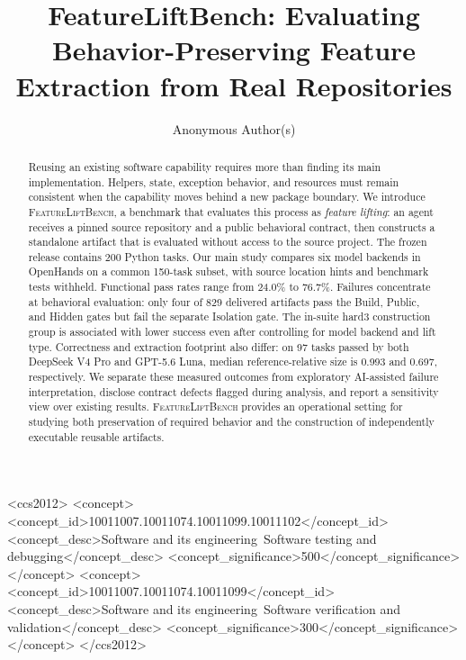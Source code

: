 \documentclass[acmsmall,screen,review,anonymous]{acmart}
\newcommand{\flb}{\textsc{FeatureLiftBench}\xspace}
\begin{document}
\title{FeatureLiftBench: Evaluating Behavior-Preserving Feature Extraction from Real Repositories}
\author{Anonymous Author(s)}

\begin{abstract}
Reusing an existing software capability requires more than finding its main
implementation. Helpers, state, exception behavior, and resources must remain
consistent when the capability moves behind a new package boundary. We introduce
\flb, a benchmark that evaluates this process as \emph{feature lifting}:
an agent receives a pinned source repository and a public behavioral contract,
then constructs a standalone artifact that is evaluated without access to the
source project. The frozen release contains 200 Python tasks. Our main study
compares six model backends in OpenHands on a common 150-task subset, with source
location hints and benchmark tests withheld. Functional pass rates range from
24.0\% to 76.7\%. Failures concentrate at behavioral evaluation: only four of
829 delivered artifacts pass the Build, Public, and Hidden gates but fail the
separate Isolation gate. The in-suite hard3 construction group is associated
with lower success even after controlling for model backend and lift type.
Correctness and extraction footprint also differ: on 97 tasks passed by both
DeepSeek V4 Pro and GPT-5.6 Luna, median reference-relative size is 0.993 and
0.697, respectively. We separate these measured outcomes from exploratory
AI-assisted failure interpretation, disclose contract defects flagged during
analysis, and report a sensitivity view over existing results. \flb provides
an operational setting for studying both preservation of required behavior and
the construction of independently executable reusable artifacts.
\end{abstract}

\begin{CCSXML}
<ccs2012>
 <concept><concept_id>10011007.10011074.10011099.10011102</concept_id>
 <concept_desc>Software and its engineering~Software testing and debugging</concept_desc>
 <concept_significance>500</concept_significance></concept>
 <concept><concept_id>10011007.10011074.10011099</concept_id>
 <concept_desc>Software and its engineering~Software verification and validation</concept_desc>
 <concept_significance>300</concept_significance></concept>
</ccs2012>
\end{CCSXML}
\maketitle
\end{document}
